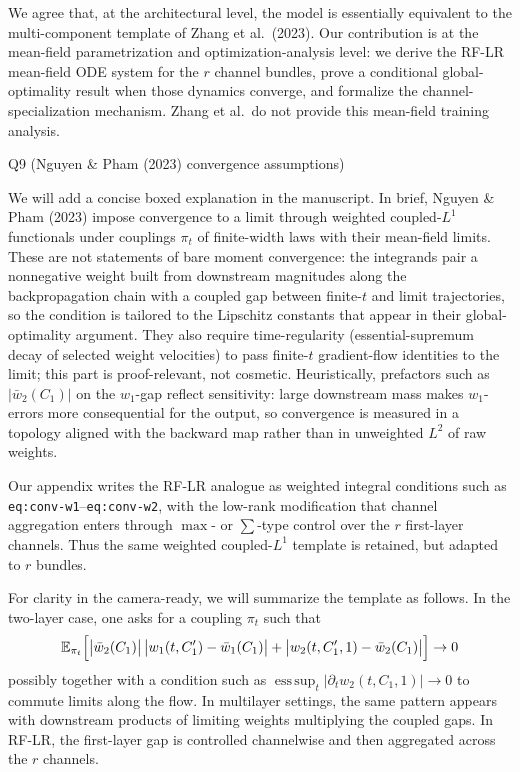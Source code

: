 We agree that, at the architectural level, the model is essentially equivalent to the multi-component template of Zhang et al.\ (2023). Our contribution is at the mean-field parametrization and optimization-analysis level: we derive the RF-LR mean-field ODE system for the $r$ channel bundles, prove a conditional global-optimality result when those dynamics converge, and formalize the channel-specialization mechanism. Zhang et al.\ do not provide this mean-field training analysis.

Q9 (Nguyen \& Pham (2023) convergence assumptions)

We will add a concise boxed explanation in the manuscript. In brief, Nguyen \& Pham (2023) impose convergence to a limit through weighted coupled-$L^1$ functionals under couplings $\pi_t$ of finite-width laws with their mean-field limits. These are not statements of bare moment convergence: the integrands pair a nonnegative weight built from downstream magnitudes along the backpropagation chain with a coupled gap between finite-$t$ and limit trajectories, so the condition is tailored to the Lipschitz constants that appear in their global-optimality argument. They also require time-regularity (essential-supremum decay of selected weight velocities) to pass finite-$t$ gradient-flow identities to the limit; this part is proof-relevant, not cosmetic. Heuristically, prefactors such as $|\bar w_2(C_1)|$ on the $w_1$-gap reflect sensitivity: large downstream mass makes $w_1$-errors more consequential for the output, so convergence is measured in a topology aligned with the backward map rather than in unweighted $L^2$ of raw weights.

Our appendix writes the RF-LR analogue as weighted integral conditions such as \texttt{eq:conv-w1}--\texttt{eq:conv-w2}, with the low-rank modification that channel aggregation enters through $\max$- or $\sum$-type control over the $r$ first-layer channels. Thus the same weighted coupled-$L^1$ template is retained, but adapted to $r$ bundles.

For clarity in the camera-ready, we will summarize the template as follows. In the two-layer case, one asks for a coupling $\pi_t$ such that
$$
\mathbb{E}_{\pi_t}\Bigl[\bigl|\bar w_2(C_1)\bigr|\,\bigl|w_1(t,C_1')-\bar w_1(C_1)\bigr|+\bigl|w_2(t,C_1',1)-\bar w_2(C_1)\bigr|\Bigr]\to 0
$$
possibly together with a condition such as $\operatorname*{ess\,sup}_t |\partial_t w_2(t,C_1,1)|\to 0$ to commute limits along the flow. In multilayer settings, the same pattern appears with downstream products of limiting weights multiplying the coupled gaps. In RF-LR, the first-layer gap is controlled channelwise and then aggregated across the $r$ channels.

